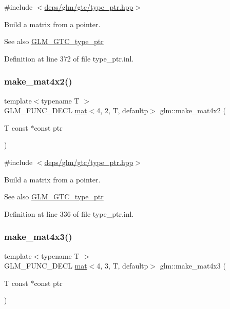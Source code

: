 {\ttfamily \#include $<$\hyperlink{type__ptr_8hpp}{deps/glm/gtc/type\+\_\+ptr.\+hpp}$>$}

Build a matrix from a pointer. \begin{DoxySeeAlso}{See also}
\hyperlink{group__gtc__type__ptr}{G\+L\+M\+\_\+\+G\+T\+C\+\_\+type\+\_\+ptr} 
\end{DoxySeeAlso}


Definition at line 372 of file type\+\_\+ptr.\+inl.

\mbox{\label{group__gtc__type__ptr_ga8b34c9b25bf3310d8ff9c828c7e2d97c}} 
\subsubsection{\texorpdfstring{make\+\_\+mat4x2()}{make\_mat4x2()}}
{\footnotesize\ttfamily template$<$typename T $>$ \\
G\+L\+M\+\_\+\+F\+U\+N\+C\+\_\+\+D\+E\+CL \hyperlink{structglm_1_1mat}{mat}$<$4, 2, T, defaultp$>$ glm\+::make\+\_\+mat4x2 (\begin{DoxyParamCaption}\item[{T const $\ast$const}]{ptr }\end{DoxyParamCaption})}



{\ttfamily \#include $<$\hyperlink{type__ptr_8hpp}{deps/glm/gtc/type\+\_\+ptr.\+hpp}$>$}

Build a matrix from a pointer. \begin{DoxySeeAlso}{See also}
\hyperlink{group__gtc__type__ptr}{G\+L\+M\+\_\+\+G\+T\+C\+\_\+type\+\_\+ptr} 
\end{DoxySeeAlso}


Definition at line 336 of file type\+\_\+ptr.\+inl.

\mbox{\label{group__gtc__type__ptr_ga0330bf6640092d7985fac92927bbd42b}} 
\subsubsection{\texorpdfstring{make\+\_\+mat4x3()}{make\_mat4x3()}}
{\footnotesize\ttfamily template$<$typename T $>$ \\
G\+L\+M\+\_\+\+F\+U\+N\+C\+\_\+\+D\+E\+CL \hyperlink{structglm_1_1mat}{mat}$<$4, 3, T, defaultp$>$ glm\+::make\+\_\+mat4x3 (\begin{DoxyParamCaption}\item[{T const $\ast$const}]{ptr }\end{DoxyParamCaption})}



